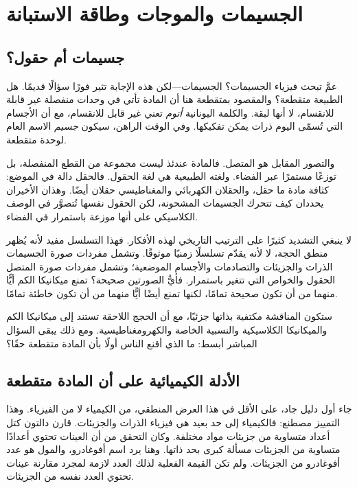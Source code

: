 \chapter{الجسيمات والموجات وطاقة الاستبانة}

\section{جسيمات أم حقول؟}

عمَّ تبحث فيزياء الجسيمات؟ الجسيمات---لكن هذه الإجابة تثير فورًا سؤالًا قديمًا. هل الطبيعة متقطعة؟ والمقصود بمتقطعة هنا أن المادة تأتي في وحدات منفصلة غير قابلة للانقسام، لا أنها لبقة. والكلمة اليونانية \emph{أتوم} تعني غير قابل للانقسام، مع أن الأجسام التي تُسمّى اليوم ذرات يمكن تفكيكها. وفي الوقت الراهن، سيكون \emph{جسيم} الاسم العام لوحدة متقطعة.

والتصور المقابل هو المتصل. فالمادة عندئذ ليست مجموعة من القطع المنفصلة، بل توزعًا مستمرًا عبر الفضاء. ولغته الطبيعية هي لغة الحقول. فالحقل دالة في الموضع: كثافة مادة ما حقل، والحقلان الكهربائي والمغناطيسي حقلان أيضًا. وهذان الأخيران يحددان كيف تتحرك الجسيمات المشحونة، لكن الحقول نفسها تُتصوَّر في الوصف الكلاسيكي على أنها موزعة باستمرار في الفضاء.

لا ينبغي التشديد كثيرًا على الترتيب التاريخي لهذه الأفكار. فهذا التسلسل مفيد لأنه يُظهر منطق الحجة، لا لأنه يقدّم تسلسلًا زمنيًا موثوقًا. وتشمل مفردات صورة الجسيمات الذرات والجزيئات والتصادمات والأجسام الموضعية؛ وتشمل مفردات صورة المتصل الحقول والخواص التي تتغير باستمرار. فأيُّ الصورتين صحيحة؟ تمنع ميكانيكا الكم أيًّا منهما من أن تكون صحيحة تمامًا، لكنها تمنع أيضًا أيًّا منهما من أن تكون خاطئة تمامًا.

ستكون المناقشة مكتفية بذاتها جزئيًا، مع أن الحجج اللاحقة تستند إلى ميكانيكا الكم والميكانيكا الكلاسيكية والنسبية الخاصة والكهرومغناطيسية. ومع ذلك يبقى السؤال المباشر أبسط: ما الذي أقنع الناس أولًا بأن المادة متقطعة حقًا؟

\section{الأدلة الكيميائية على أن المادة متقطعة}

جاء أول دليل جاد، على الأقل في هذا العرض المنطقي، من الكيمياء لا من الفيزياء. وهذا التمييز مصطنع: فالكيمياء إلى حد بعيد هي فيزياء الذرات والجزيئات. قارن دالتون كتل أعداد متساوية من جزيئات مواد مختلفة. وكان التحقق من أن العينات تحتوي أعدادًا متساوية من الجزيئات مسألة كبرى بحد ذاتها. وهنا يرد اسم أفوغادرو، والمول هو عدد أفوغادرو من الجزيئات. ولم تكن القيمة الفعلية لذلك العدد لازمة لمجرد مقارنة عينات تحتوي العدد نفسه من الجزيئات.

